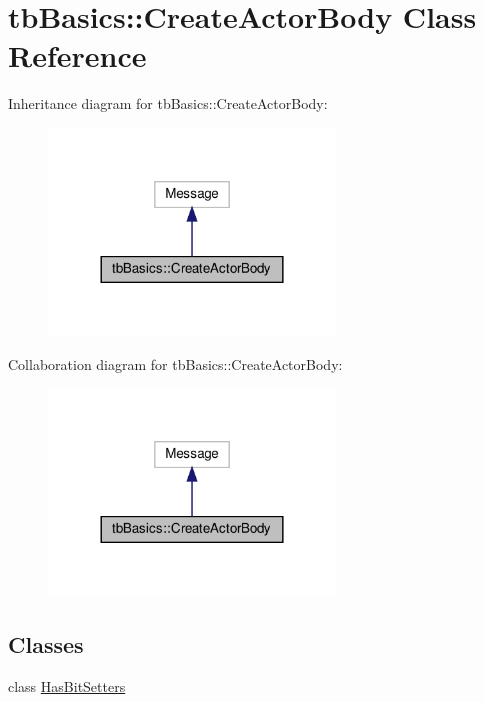 \hypertarget{classtbBasics_1_1CreateActorBody}{}\section{tb\+Basics\+:\+:Create\+Actor\+Body Class Reference}
\label{classtbBasics_1_1CreateActorBody}


Inheritance diagram for tb\+Basics\+:\+:Create\+Actor\+Body\+:
\nopagebreak
\begin{figure}[H]
\begin{center}
\leavevmode
\includegraphics[width=216pt]{classtbBasics_1_1CreateActorBody__inherit__graph}
\end{center}
\end{figure}


Collaboration diagram for tb\+Basics\+:\+:Create\+Actor\+Body\+:
\nopagebreak
\begin{figure}[H]
\begin{center}
\leavevmode
\includegraphics[width=216pt]{classtbBasics_1_1CreateActorBody__coll__graph}
\end{center}
\end{figure}
\subsection*{Classes}
\begin{DoxyCompactItemize}
\item 
class \hyperlink{classtbBasics_1_1CreateActorBody_1_1HasBitSetters}{Has\+Bit\+Setters}
\end{DoxyCompactItemize}
